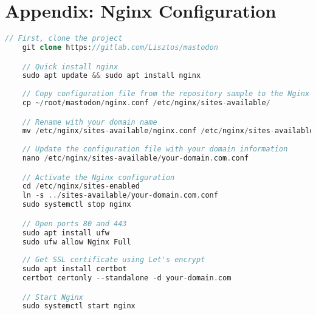 \chapter{Appendix: Nginx Configuration}
\label{appendix:nginx_configuration}

\lstset{style=CodeStyle}
  \begin{lstlisting}[language=PHP, caption=Adding Nginx configuration file., float=h]
    // First, clone the project
    git clone https://gitlab.com/Lisztos/mastodon

    // Quick install nginx
    sudo apt update && sudo apt install nginx
    
    // Copy configuration file from the repository sample to the Nginx folder
    cp ~/root/mastodon/nginx.conf /etc/nginx/sites-available/

    // Rename with your domain name
    mv /etc/nginx/sites-available/nginx.conf /etc/nginx/sites-available/your-domain.com.conf
    
    // Update the configuration file with your domain information 
    nano /etc/nginx/sites-available/your-domain.com.conf

    // Activate the Nginx configuration
    cd /etc/nginx/sites-enabled
    ln -s ../sites-available/your-domain.com.conf
    sudo systemctl stop nginx

    // Open ports 80 and 443
    sudo apt install ufw
    sudo ufw allow Nginx Full
  
    // Get SSL certificate using Let's encrypt
    sudo apt install certbot
    certbot certonly --standalone -d your-domain.com

    // Start Nginx
    sudo systemctl start nginx
    
\end{lstlisting}


